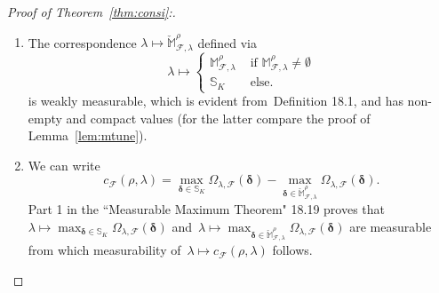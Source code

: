 \documentclass[11pt, a4paper]{article}
\theoremstyle{definition}
\begin{document}
\begin{proof}[Proof of Theorem~\ref{thm:consi}:]
\begin{enumerate}
\begin{equation*}
\big) - \rho = 0
\big \}
\end{equation*}
and using Lemmas 18.7 and 18.8 together with the union part of 18.4 shows that $\lambda \mapsto \mathbb{M}_{\mathcal{F},  \lambda}^{\rho}$  is a measurable correspondence. 
\item The correspondence $\lambda \mapsto \check{\mathbb{M}}_{\mathcal{F}, \lambda}^{\rho}$ defined via $$\lambda \mapsto \begin{cases}
\mathbb{M}_{\mathcal{F},  \lambda}^{\rho} & \text{ if } 	\mathbb{M}_{\mathcal{F},  \lambda}^{\rho} \neq \emptyset \\
\mathbb{S}_K & \text{ else}.
\end{cases} $$
is weakly measurable, which is evident from~Definition 18.1, and has non-empty and compact values (for the latter compare the proof of Lemma~\ref{lem:mtune}).
\item We can write $$c_{\mathcal{F}}(\rho, \lambda) = \max_{\bm{\delta} \in \mathbb{S}_K} \Omega_{\lambda, \mathcal{F}}(\bm{\delta}) - \max_{\bm{\delta} \in \check{\mathbb{M}}_{\mathcal{F}, \lambda}^{\rho}} \Omega_{\lambda, \mathcal{F}}(\bm{\delta}).$$ Part 1 in the ``Measurable Maximum Theorem" 18.19 proves that~$\lambda \mapsto \max_{\bm{\delta} \in \mathbb{S}_K} \Omega_{\lambda, \mathcal{F}}(\bm{\delta})$ and~$\lambda \mapsto \max_{\bm{\delta} \in \check{\mathbb{M}}_{\mathcal{F}, \lambda}^{\rho}} \Omega_{\lambda, \mathcal{F}}(\bm{\delta})$ are measurable from which measurability of~$\lambda \mapsto c_{\mathcal{F}}(\rho, \lambda)$ follows.
\end{enumerate}


\end{proof}
\end{document}
